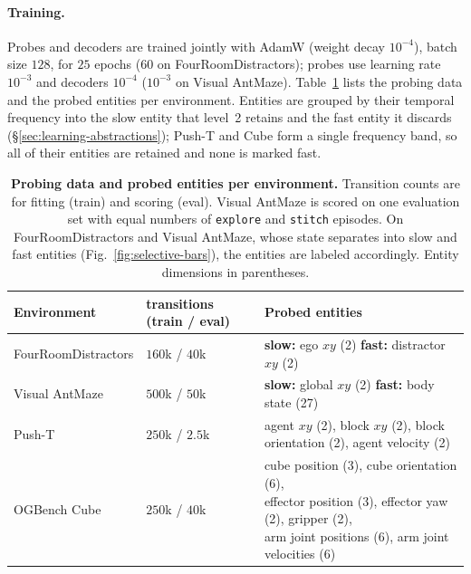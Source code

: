 \paragraph{Training.} Probes and decoders are trained jointly with AdamW (weight
decay $10^{-4}$), batch size $128$, for $25$ epochs ($60$ on FourRoomDistractors);
probes use learning rate $10^{-3}$ and decoders $10^{-4}$ ($10^{-3}$ on Visual
AntMaze). Table~\ref{tab:impl-probing} lists the probing data and the probed entities
per environment. Entities are grouped by their temporal frequency into the slow entity
that level~2 retains and the fast entity it discards (\S\ref{sec:learning-abstractions}); Push-T
and Cube form a single frequency band, so all of their entities are retained and none is
marked fast.

\begin{table}[ht]
\centering
\small
\setlength{\tabcolsep}{5pt}
\caption{\textbf{Probing data and probed entities per environment.} Transition counts
are for fitting (train) and scoring (eval). Visual AntMaze is scored on one evaluation
set with equal numbers of \texttt{explore} and \texttt{stitch} episodes. On FourRoomDistractors and Visual
AntMaze, whose state separates into slow and fast entities
(Fig.~\ref{fig:selective-bars}), the entities are labeled accordingly. Entity
dimensions in parentheses.}
\label{tab:impl-probing}
\begin{tabular}{lll}
\toprule
Environment & transitions (train / eval) & Probed entities \\
\midrule
FourRoomDistractors & $160$k / $40$k & \makecell[l]{\textbf{slow:} ego $xy$ (2)\\ \textbf{fast:} distractor $xy$ (2)} \\
\addlinespace
Visual AntMaze & $500$k / $50$k & \makecell[l]{\textbf{slow:} global $xy$ (2)\\ \textbf{fast:} body state (27)} \\
\addlinespace
Push-T & $250$k / $2.5$k & \makecell[l]{agent $xy$ (2), block $xy$ (2),\\ block orientation (2), agent velocity (2)} \\
\addlinespace
OGBench Cube & $250$k / $40$k & \makecell[l]{cube position (3), cube orientation (6),\\ effector position (3), effector yaw (2), gripper (2),\\ arm joint positions (6), arm joint velocities (6)} \\
\bottomrule
\end{tabular}
\end{table}

